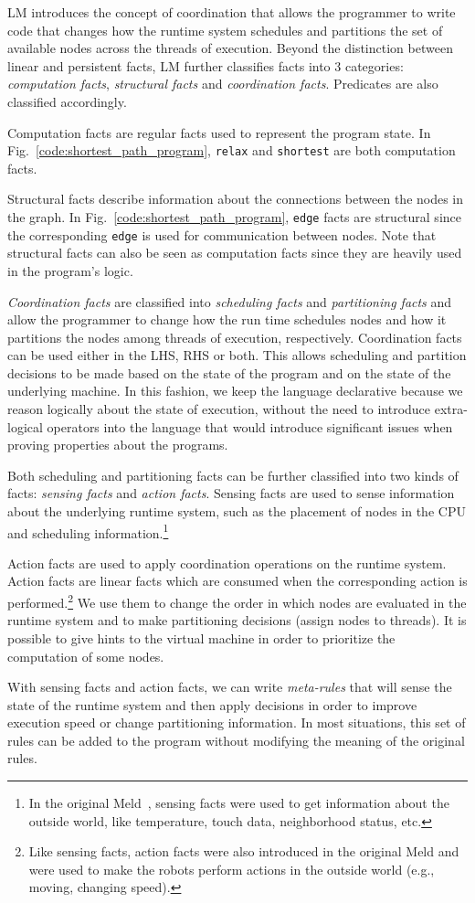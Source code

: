 LM introduces the concept of coordination that allows the programmer to write
code that changes how the runtime system schedules and partitions the set of
available nodes across the threads of execution. Beyond the distinction between
linear and persistent facts, LM further classifies facts into 3 categories:
\emph{computation facts}, \emph{structural facts} and \emph{coordination facts}.
Predicates are also classified accordingly.

Computation facts are regular facts used to represent the program state. In
Fig.~\ref{code:shortest_path_program}, \texttt{relax} and \texttt{shortest} are
both computation facts.

Structural facts describe information about the connections between the nodes in
the graph. In Fig.~\ref{code:shortest_path_program}, \texttt{edge} facts are
structural since the corresponding \texttt{edge} is used for communication
between nodes.  Note that structural facts can also be seen as computation facts
since they are heavily used in the program's logic.

\emph{Coordination facts} are classified into \emph{scheduling facts} and
\emph{partitioning facts} and allow the programmer to change how the run time
schedules nodes and how it partitions the nodes among threads of execution,
respectively. Coordination facts can be used either in the LHS, RHS or both.
This allows scheduling and partition decisions to be made based on the state of
the program and on the state of the underlying machine.  In this fashion, we
keep the language declarative because we reason logically about the state of
execution, without the need to introduce extra-logical operators into the
language that would introduce significant issues when proving properties about
the programs.

Both scheduling and partitioning facts can be further classified into two kinds
of facts: \emph{sensing facts} and \emph{action facts}. Sensing facts are used
to sense information about the underlying runtime system, such as the placement
of nodes in the CPU and scheduling information.\footnote{In the original
   Meld~\cite{ashley-rollman-iclp09}, sensing facts were used to get information
about the outside world, like temperature, touch data, neighborhood status,
etc.}

Action facts are used to apply coordination operations on the runtime system.
Action facts are linear facts which are consumed when the corresponding action
is performed.\footnote{Like sensing facts, action facts were also introduced in the
original Meld and were used to make the robots perform actions in the outside
world (e.g., moving, changing speed).} We use them to change the order in
which nodes are evaluated in the runtime system and to make partitioning
decisions (assign nodes to threads). It is possible to give hints to the virtual
machine in order to prioritize the computation of some nodes.

With sensing facts and action facts, we can write \emph{meta-rules} that will
sense the state of the runtime system and then apply decisions in order to
improve execution speed or change partitioning information. In most situations,
this set of rules can be added to the program without modifying the meaning of
the original rules.
